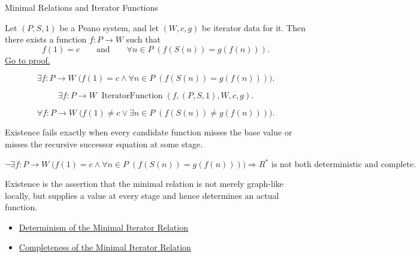 \begin{topicbox}{Minimal Relations and Iterator Functions}
\begin{tcolorbox}[colback=lembox, colframe=lemborder, arc=2pt,
  left=6pt, right=6pt, top=4pt, bottom=4pt,
  title={\small\textbf{Lemma (Existence of an Iterator Function)}},
  fonttitle=\small\bfseries]
\begin{lemma}
\label{lem:existence-of-iterator-function}
Let $(P,S,1)$ be a Peano system, and let $(W,c,g)$ be iterator data for it.
Then there exists a function $f:P\to W$ such that
\[
f(1)=c
\qquad\text{and}\qquad
\forall n\in P\;(f(S(n))=g(f(n))).
\]
\hyperref[prf:existence-of-iterator-function]{Go to proof.}
\end{lemma}
\end{tcolorbox}

\begin{remark*}
\[
\exists f:P\to W\;
\bigl(f(1)=c\land \forall n\in P\;(f(S(n))=g(f(n)))\bigr).
\]
\end{remark*}

\begin{remark*}
\[
\exists f:P\to W\;
\operatorname{IteratorFunction}(f,(P,S,1),W,c,g).
\]
\end{remark*}

\begin{remark*}
\[
\forall f:P\to W\;
\bigl(f(1)\neq c\lor \exists n\in P\;(f(S(n))\neq g(f(n)))\bigr).
\]
\end{remark*}

\begin{remark*}
Existence fails exactly when every candidate function misses the base value or
misses the recursive successor equation at some stage.
\end{remark*}

\begin{remark*}
\[
\neg\exists f:P\to W\;
\bigl(f(1)=c\land \forall n\in P\;(f(S(n))=g(f(n)))\bigr)
\Longrightarrow
R^* \text{ is not both deterministic and complete}.
\]
\end{remark*}

\begin{remark*}[Interpretation]
Existence is the assertion that the minimal relation is not merely graph-like
locally, but supplies a value at every stage and hence determines an actual
function.
\end{remark*}

\begin{dependencies}
\begin{itemize}
  \item \hyperref[lem:minimal-iterator-relation-deterministic]{Determinism of the Minimal Iterator Relation}
  \item \hyperref[lem:minimal-iterator-relation-complete]{Completeness of the Minimal Iterator Relation}
\end{itemize}
\end{dependencies}


\end{topicbox}
